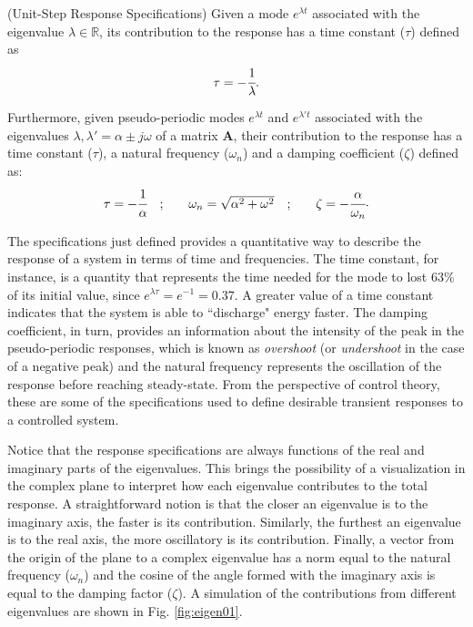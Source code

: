 \documentclass[a4paper,11pt]{book}
\numberwithin{figure}{chapter}
\numberwithin{equation}{chapter}
\numberwithin{table}{chapter}
\theoremstyle{definition}
\newtheorem{definition}{Definition}[chapter]
\newcounter{boxed-theorem}
\newcounter{boxed-definition}
\newenvironment{boxed-definition}[1]
{\colorlet{shadecolor}{pastelYellow!15} \begin{shaded} \begin{definition}{#1}}
{\end{definition} \end{shaded}}
\newcounter{boxed-example}
\begin{document}
\begin{boxed-definition}{(Unit-Step Response Specifications)} \label{def:responseParameters}
    Given a mode $e^{\lambda t}$ associated with the eigenvalue $\lambda \in \mathbb{R}$, its contribution to the response has a time constant ($\tau$) defined as
    \begin{equation}
        \tau = - \cfrac{1}{\lambda}
    .\end{equation}  
    
    Furthermore, given pseudo-periodic modes $e^{\lambda t}$ and $e^{\lambda' t}$ associated with the eigenvalues $\lambda,\lambda' = \alpha \pm j \omega$ of a matrix $\bm{A}$, their contribution to the response has a time constant ($\tau$), a natural frequency ($\omega_n$) and a damping coefficient ($\zeta$) defined as:
    \begin{equation}
    \begin{matrix}
        \tau = - \cfrac{1}{\alpha} &; & & \omega_n = \sqrt{\alpha^2 + \omega^2} &; & & \zeta = - \cfrac{\alpha}{\omega_n}
    \end{matrix}
    .\end{equation}
    
\end{boxed-definition}   

The specifications just defined provides a quantitative way to describe the response of a system in terms of time and frequencies. The time constant, for instance, is a quantity that represents the time needed for the mode to lost $63\%$ of its initial value, since $e^{\lambda \tau} = e^{-1} = 0.37$. A greater value of a time constant indicates that the system is able to ``discharge" energy faster. The damping coefficient, in turn, provides an information about the intensity of the peak in the pseudo-periodic responses, which is known as \textit{overshoot} (or \textit{undershoot} in the case of a negative peak) and the natural frequency represents the oscillation of the response before reaching steady-state. From the perspective of control theory, these are some of the specifications used to define desirable transient responses to a controlled system.

Notice that the response specifications are always functions of the real and imaginary parts of the eigenvalues. This brings the possibility of a visualization in the complex plane to interpret how each eigenvalue contributes to the total response. A straightforward notion is that the closer an eigenvalue is to the imaginary axis, the faster is its contribution. Similarly, the furthest an eigenvalue is to the real axis, the more oscillatory is its contribution. Finally, a vector from the origin of the plane to a complex eigenvalue has a norm equal to the natural frequency ($\omega_n$) and the cosine of the angle formed with the imaginary axis is equal to the damping factor ($\zeta$). A simulation of the contributions from different eigenvalues are shown in Fig. \ref{fig:eigen01}.
\end{document}
